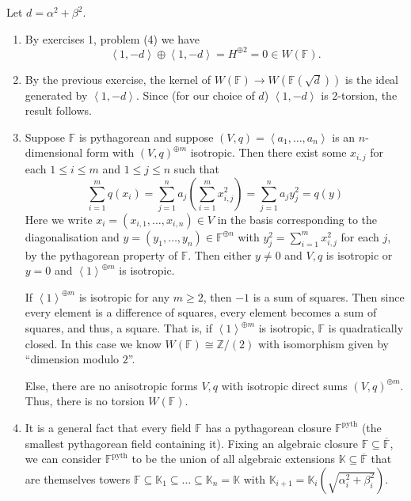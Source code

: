 \documentclass[12 pt, letterpaper]{hmcpset}
\begin{document}
\begin{solution}
	Let $d = \alpha^{2} + \beta^{2}$.
	\begin{enumerate}
		\item By exercises 1, problem (4) we have
			\[
				\left < 1, -d \right > \oplus \left < 1, -d \right > = H^{\oplus 2} = 0 \in W(\mathbb{F}).
			\]

		\item By the previous exercise, the kernel of  $W(\mathbb{F}) \to W(\mathbb{F}(\sqrt{d}))$ is the ideal generated by $\left < 1, -d \right >$. Since (for our choice of $d$) $\left < 1, -d \right >$ is $2$-torsion, the result follows.

		\item Suppose $\mathbb{F}$ is pythagorean and suppose $(V, q) = \left < a_{1}, \dots, a_{n} \right >$ is an $n$-dimensional form with $(V, q)^{\oplus m}$ isotropic. Then there exist some $x_{i, j}$ for each  $1 \le i \le m$ and $1 \le j \le n$ such that
			\[
				\sum_{i = 1}^{m} q(x_{i}) = \sum_{j = 1}^{n} a_{j} \left ( \sum_{i = 1}^{m} x_{i, j}^{2} \right ) = \sum_{j = 1}^{n} a_{j} y_{j}^{2} = q(y)
			\]
			Here we write $x_{i} = (x_{i, 1}, \dots, x_{i, n}) \in V$ in the basis corresponding to the diagonalisation and $y = (y_{1}, \dots, y_{n}) \in \mathbb{F}^{\oplus n}$ with $y_{j}^{2} = \sum_{i = 1}^{m} x_{i, j}^{2}$ for each $j$, by the pythagorean property of $\mathbb{F}$. Then either $y \neq 0$ and $V, q$ is isotropic or $y = 0$ and $\left < 1 \right >^{\oplus m}$ is isotropic.

			If $\left < 1 \right >^{\oplus m}$ is isotropic for any $m \ge 2$, then $-1$ is a sum of squares. Then since every element is a difference of squares, every element becomes a sum of squares, and thus, a square. That is, if $\left < 1 \right >^{\oplus m}$ is isotropic, $\mathbb{F}$ is quadratically closed. In this case we know $W(\mathbb{F}) \cong \mathbb{Z} / (2)$ with isomorphism given by ``dimension modulo $2$''.

			Else, there are no anisotropic forms $V, q$ with isotropic direct sums $(V, q)^{\oplus m}$. Thus, there is no torsion $W(\mathbb{F})$.

		\item It is a general fact that every field $\mathbb{F}$ has a pythagorean closure $\mathbb{F}^{\text{pyth}}$ (the smallest pythagorean field containing it). Fixing an algebraic closure $\mathbb{F} \subseteq \overline{\mathbb{F}}$, we can consider $\mathbb{F}^{\text{pyth}}$ to be the union of all algebraic extensions $\mathbb{K} \subseteq \overline{\mathbb{F}}$ that are themselves towers $\mathbb{F} \subseteq \mathbb{K}_{1} \subseteq \dots \subseteq \mathbb{K}_{n} = \mathbb{K}$ with $\mathbb{K}_{i + 1} = \mathbb{K}_{i}(\sqrt{\alpha_{i}^{2} + \beta_{i}^{2}})$.


\end{enumerate}
\end{solution}
\end{document}
